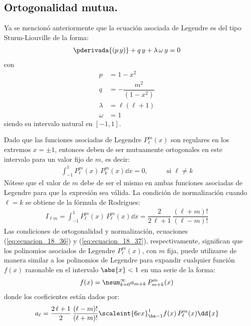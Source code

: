 \subsection{Ortogonalidad mutua.}

Ya se mencionó anteriormente que la ecuación asociada de Legendre es del tipo Sturm-Liouville de la forma:
\begin{align*}
\pderivada{(p \, y)} + q \, y + \lambda \,  \omega \, y = 0
\end{align*}
con
\begin{align*}
p &= 1 - x^{2} \\[0.5em]
q &= - \dfrac{m^{2}}{(1 - x^{2})} \\[0.5em]
\lambda &= \ell (\ell + 1) \\[0.5em]
\omega &= 1
\end{align*}
siendo su intervalo natural en $[-1,1]$.
\par
Dado que las funciones asociadas de Legendre $P_{\ell}^{m} (x)$ son regulares en los extremos $x = \pm 1$, entonces deben de ser mutuamente ortogonales en este intervalo para un valor fijo de $m$, es decir:
\begin{align}
\int_{-1}^{1} P_{\ell}^{m} (x) \, P_{k}^{m} (x) \dd{x}  = 0, \hspace{1cm} \mbox{ si } \ell \neq	 k
\label{eq:ecuacion_18_36}
\end{align}
Nótese que el valor de $m$ debe de ser el mismo en ambas funciones asociadas de Legendre para que la expresión sea válida. La condición de normalización cuando $\ell = k$ se obtiene de la fórmula de Rodrigues:
\begin{align}
I_{\ell m} = \int_{-1}^{1} P_{\ell}^{m} (x) \, P_{\ell}^{m} (x) \dd{x} = \dfrac{2}{2 \, \ell + 1} \, \dfrac{(\ell + m)!}{( \ell - m)!}
\label{eq:ecuacion_18_37}
\end{align}
Las condiciones de ortogonalidad y normalización, ecuaciones (\ref{eq:ecuacion_18_36}) y (\ref{eq:ecuacion_18_37}), respectivamente, significan que los polinomios asociados de Legendre $P_{\ell}^{m}(x)$, con $m$ fija, puede utilizarse de manera similar a los polinomios de Legendre para expandir cualquier función $f(x)$ razonable en el intervalo $\abs{x} < 1$ en una serie de la forma:
\begin{align}
f(x) = \nsum_{k=0}^{\infty} a_{m+k} \, P_{m+k}^{m} (x)
\label{eq:ecuacion_18_38}
\end{align}
donde los coeficientes están dados por:
\begin{align*}
a_{\ell} = \dfrac{2 \, \ell + 1}{2} \, \dfrac{(\ell - m)!}{(\ell + m)!} \scaleint{6ex}_{\bs -1}^{1} f(x) \, P_{\ell}^{m} (x) \dd{x}
\end{align*}

